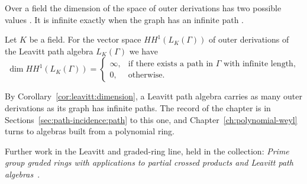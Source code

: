 Over a field the dimension of the space of outer derivations has two possible
values \cite[p.~79]{Lopatkin2019}. It is infinite exactly when the graph has
an infinite path \cite[p.~79]{Lopatkin2019}.

\begin{corollary}\label{cor:leavitt:dimension}
Let $K$ be a field. For the vector space $HH^{1}(L_{K}(\Gamma))$ of outer
derivations of the Leavitt path algebra $L_{K}(\Gamma)$ we have
\begin{equation*}
\dim HH^{1}(L_{K}(\Gamma))=
\begin{cases}
\infty, & \text{if there exists a path in }\Gamma\text{ with infinite length},\\
0, & \text{otherwise}.
\end{cases}
\end{equation*}
\end{corollary}

By Corollary~\ref{cor:leavitt:dimension}, a Leavitt path algebra carries as
many outer derivations as its graph has infinite paths. The record of the
chapter is in Sections~\ref{sec:path-incidence:path} to this one, and
Chapter~\ref{ch:polynomial-weyl} turns to algebras built from a polynomial
ring.

Further work in the Leavitt and graded-ring line, held in the collection:
\noindent\emph{Prime group graded rings with applications to partial crossed
products and Leavitt path algebras}~\cite{LibPrimeGroupGradedRings2021}.
